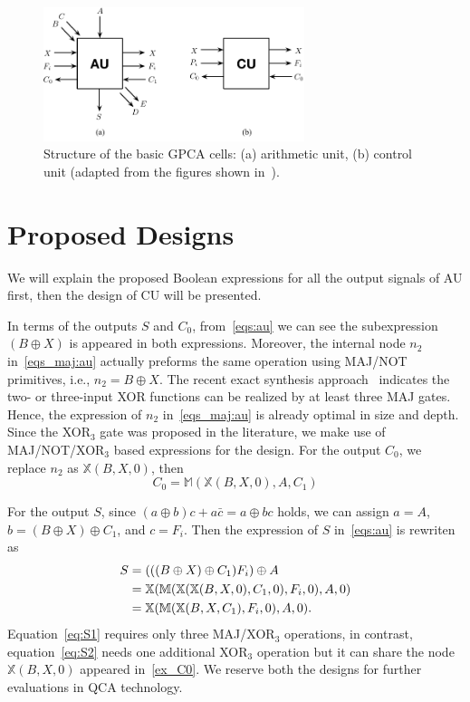 \documentclass[9pt,journal,compsoc]{IEEEtran}
\begin{document}
 
\begin{figure}[t]
    \centering
    \includegraphics[width=3.0in]{fig/aucu_cells.pdf}\vspace{-3ex}
    \caption{Structure of the basic GPCA cells: (a) arithmetic unit, (b) control unit  (adapted from the figures shown in~\cite{4,2}).} \label{fig:structure}
    \vspace{-3ex}
\end{figure}    

\vspace{-3ex}
\section{Proposed Designs}
We will explain the proposed Boolean expressions for all the output signals of AU first, then the design of CU will be presented.

In terms of the outputs $S$ and $C_0$, from~\eqref{eqs:au} we can see the
subexpression $(B \oplus X)$ is appeared in both expressions. Moreover, the internal node $n_2$ in~\eqref{eqs_maj:au} actually preforms the same operation using MAJ/NOT primitives, i.e., $n_2 = B \oplus X$.
The recent exact synthesis approach~\cite{soeken2017exact} indicates the two- or three-input XOR functions can be realized by at least three MAJ gates. Hence, the expression of $n_2$ in~\eqref{eqs_maj:au} is already optimal in size and depth.
Since the XOR$_3$ gate was proposed in the literature, we make use of MAJ/NOT/XOR$_3$ based expressions for the design.
For the output $C_0$, we replace $n_2$ as $\mathbb{X}(B, X, 0)$, then
\begin{equation}\label{ex_C0}
C_{0} = \mathbb{M}(\mathbb{X}(B, X, 0), A, C_{1})
\end{equation}

For the output $S$, since $(a \oplus b)c + a\bar c = a \oplus bc$ holds, we can assign $a = A$, $b = (B \oplus X) \oplus C_1$, and $c = F_i$. Then
the expression of $S$ in~\eqref{eqs:au} is rewriten as
\begin{subequations}\label{ex_S}
\begin{align}
S &= (((B \oplus X) \oplus C_1)F_i) \oplus A \notag \\
  &= \mathbb{X}(\mathbb{M}(\mathbb{X}(\mathbb{X}(B, X, 0), C_{1}, 0), F_{i}, 0), A, 0) \label{eq:S2} \\
  &= \mathbb{X}(\mathbb{M}(\mathbb{X}(B, X, C_1), F_i, 0), A, 0). \label{eq:S1} 
\end{align}
\end{subequations}
Equation~\eqref{eq:S1} requires only three MAJ/XOR$_3$ operations, in contrast, equation~\eqref{eq:S2} needs one additional XOR$_3$ operation but it can share the node $\mathbb{X}(B, X, 0)$ appeared in~\eqref{ex_C0}.
We reserve both the designs for further evaluations in QCA technology.
\end{document}
